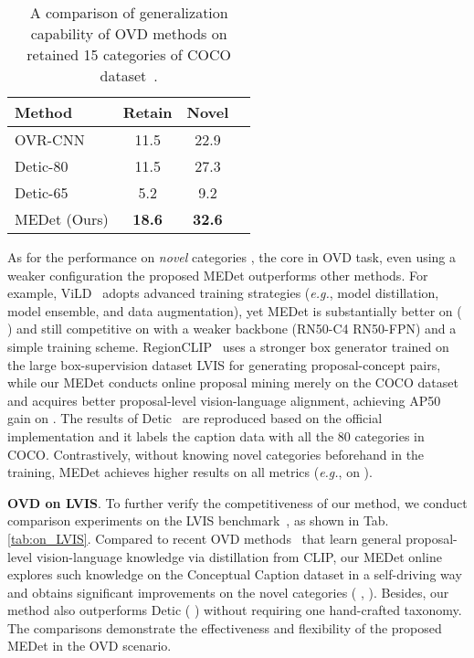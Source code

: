 \documentclass[10pt,twocolumn,letterpaper]{article}
\begin{document}
\begin{table}[t]
    \centering
    \caption{
    A comparison of generalization capability of OVD methods on retained 15 categories of COCO dataset~\cite{mscoco}.}
    \footnotesize{
    \begin{tabular}{l|ccc}
        \toprule
        Method & Retain & Novel & \color{gray}{All} \\
\midrule
        OVR-CNN~\cite{ovrcnn}  & 11.5  & 22.9  & \color{gray}{38.1}  \\
        Detic-80~\cite{detic} & 11.5 & 27.3  & \color{gray}{38.3}  \\
        Detic-65~\cite{detic}  & 5.2 & 9.2  & \color{gray}{34.1} \\
        \midrule
        \rowcolor{gray!25} MEDet (Ours) & \textbf{18.6} & \textbf{32.6} & \color{gray}{42.4} \\
        \bottomrule
    \end{tabular}
    }
    \label{tab:coco_other_15}
\end{table}



As for the performance on \emph{novel} categories , the core in OVD task, even using a weaker configuration the proposed MEDet outperforms other methods. For example,
ViLD~\cite{vild} adopts advanced training strategies (\emph{e.g.}, model distillation, model ensemble, and data augmentation), yet MEDet is substantially better on  ( \vs ) and still competitive on  with a weaker backbone (RN50-C4 \vs RN50-FPN) and a simple training scheme.
RegionCLIP~\cite{regionCLIP} uses a stronger box generator trained on the large box-supervision dataset LVIS for generating proposal-concept pairs, while our MEDet conducts online proposal mining merely on the COCO dataset and acquires better proposal-level vision-language alignment, achieving  AP50 gain on .
The results of Detic~\cite{detic} are reproduced based on the official implementation and it labels the caption data with all the 80 categories in COCO.
Contrastively, without knowing novel categories beforehand in the training, MEDet achieves higher results on all metrics (\emph{e.g.},  \vs  on ).



\textbf{OVD on LVIS}.
To further verify the competitiveness of our method, we conduct comparison experiments on the LVIS benchmark~\cite{lvis}, as shown in Tab.\,\ref{tab:on_LVIS}.
Compared to recent OVD methods~\cite{regionCLIP,vild} that learn general proposal-level vision-language knowledge via distillation from CLIP, our MEDet online explores such knowledge  on the Conceptual Caption dataset in a self-driving way and
obtains significant improvements on the  novel categories  ( \vs , ).
Besides, our method also outperforms Detic ( \vs ) without requiring one hand-crafted taxonomy. The comparisons demonstrate the effectiveness and flexibility of the proposed MEDet in the OVD scenario.
\end{document}
